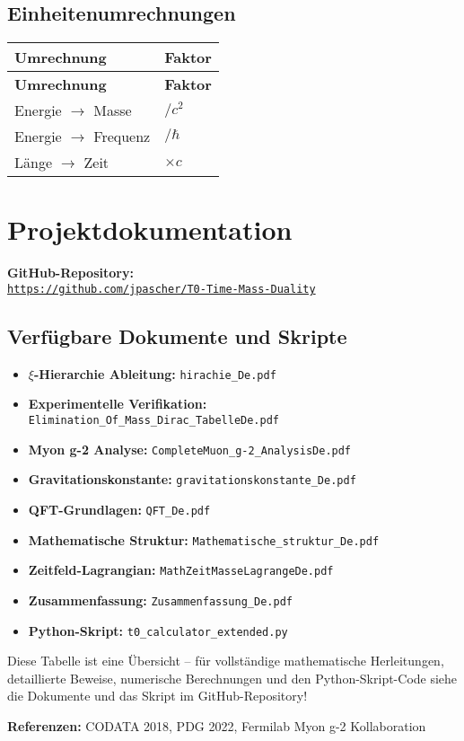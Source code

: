 \documentclass[12pt,a4paper]{article}
\begin{document}
	\subsection{Einheitenumrechnungen}
	\begin{longtable}{|p{5cm}|p{5cm}|}
		\hline
		\textbf{Umrechnung} & \textbf{Faktor} \\
		\hline
		\endfirsthead
		\hline
		\textbf{Umrechnung} & \textbf{Faktor} \\
		\hline
		\endhead
		Energie $\rightarrow$ Masse & $/c^{2}$ \\
		\hline
		Energie $\rightarrow$ Frequenz & $/\hbar$ \\
		\hline
		Länge $\rightarrow$ Zeit & $\times c$ \\
		\hline
	\end{longtable}
	
	\section{Projektdokumentation}
	\textbf{GitHub-Repository:}\\
	\texttt{\url{https://github.com/jpascher/T0-Time-Mass-Duality}}
	
	\subsection{Verfügbare Dokumente und Skripte}
	\begin{itemize}
		\item \textbf{$\xi$-Hierarchie Ableitung:} \texttt{hirachie\_De.pdf}
		\item \textbf{Experimentelle Verifikation:} \texttt{Elimination\_Of\_Mass\_Dirac\_TabelleDe.pdf}
		\item \textbf{Myon g-2 Analyse:} \texttt{CompleteMuon\_g-2\_AnalysisDe.pdf}
		\item \textbf{Gravitationskonstante:} \texttt{gravitationskonstante\_De.pdf}
		\item \textbf{QFT-Grundlagen:} \texttt{QFT\_De.pdf}
		\item \textbf{Mathematische Struktur:} \texttt{Mathematische\_struktur\_De.pdf}
		\item \textbf{Zeitfeld-Lagrangian:} \texttt{MathZeitMasseLagrangeDe.pdf}
		\item \textbf{Zusammenfassung:} \texttt{Zusammenfassung\_De.pdf}
		\item \textbf{Python-Skript:} \texttt{t0\_calculator\_extended.py}
	\end{itemize}
	
	Diese Tabelle ist eine Übersicht – für vollständige mathematische Herleitungen, detaillierte Beweise, numerische Berechnungen und den Python-Skript-Code siehe die Dokumente und das Skript im GitHub-Repository!
	
	\textbf{Referenzen:} CODATA 2018, PDG 2022, Fermilab Myon g-2 Kollaboration
	
\end{document}

